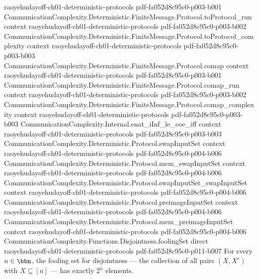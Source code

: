 \begin{theorem}
  {raoyehudayoff-ch01-deterministic-protocols}
  {pdf-fa052d8c95c0-p003-b001}
\proofstep
  {CommunicationComplexity.Deterministic.FiniteMessage.Protocol.toProtocol_run}
  {context}
  {raoyehudayoff-ch01-deterministic-protocols}
  {pdf-fa052d8c95c0-p003-b002}
\proofstep
  {CommunicationComplexity.Deterministic.FiniteMessage.Protocol.toProtocol_complexity}
  {context}
  {raoyehudayoff-ch01-deterministic-protocols}
  {pdf-fa052d8c95c0-p003-b003}
\proofstep
  {CommunicationComplexity.Deterministic.FiniteMessage.Protocol.comap}
  {context}
  {raoyehudayoff-ch01-deterministic-protocols}
  {pdf-fa052d8c95c0-p003-b001}
\proofstep
  {CommunicationComplexity.Deterministic.FiniteMessage.Protocol.comap_run}
  {context}
  {raoyehudayoff-ch01-deterministic-protocols}
  {pdf-fa052d8c95c0-p003-b002}
\proofstep
  {CommunicationComplexity.Deterministic.FiniteMessage.Protocol.comap_complexity}
  {context}
  {raoyehudayoff-ch01-deterministic-protocols}
  {pdf-fa052d8c95c0-p003-b003}
\proofstep
  {CommunicationComplexity.Internal.enat_iInf_le_coe_iff}
  {context}
  {raoyehudayoff-ch01-deterministic-protocols}
  {pdf-fa052d8c95c0-p003-b003}
\proofstep
  {CommunicationComplexity.Deterministic.Protocol.swapInputSet}
  {context}
  {raoyehudayoff-ch01-deterministic-protocols}
  {pdf-fa052d8c95c0-p004-b006}
\proofstep
  {CommunicationComplexity.Deterministic.Protocol.mem_swapInputSet}
  {context}
  {raoyehudayoff-ch01-deterministic-protocols}
  {pdf-fa052d8c95c0-p004-b006}
\proofstep
  {CommunicationComplexity.Deterministic.Protocol.swapInputSet_swapInputSet}
  {context}
  {raoyehudayoff-ch01-deterministic-protocols}
  {pdf-fa052d8c95c0-p004-b006}
\proofstep
  {CommunicationComplexity.Deterministic.Protocol.preimageInputSet}
  {context}
  {raoyehudayoff-ch01-deterministic-protocols}
  {pdf-fa052d8c95c0-p004-b006}
\proofstep
  {CommunicationComplexity.Deterministic.Protocol.mem_preimageInputSet}
  {context}
  {raoyehudayoff-ch01-deterministic-protocols}
  {pdf-fa052d8c95c0-p004-b006}
\proofstep
  {CommunicationComplexity.Functions.Disjointness.foolingSet}
  {direct}
  {raoyehudayoff-ch01-deterministic-protocols}
  {pdf-fa052d8c95c0-p011-b007}
For every $n \in \bbn$, the fooling set for disjointness — the collection of all pairs
$(X, X^c)$ with $X \subseteq [n]$ — has exactly $2^n$ elements.
\end{theorem}

